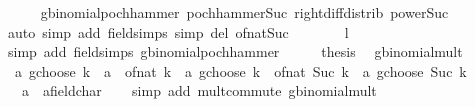 \begin{isabellebody}
\ \ \ \ \isamarkupfalse%
\ gbinomial{\isacharunderscore}{\kern0pt}pochhammer\ pochhammer{\isacharunderscore}{\kern0pt}Suc\ right{\isacharunderscore}{\kern0pt}diff{\isacharunderscore}{\kern0pt}distrib\ power{\isacharunderscore}{\kern0pt}Suc\isanewline
\ \ \ \ \isamarkupfalse%
\ {\isacharparenleft}{\kern0pt}auto\ simp\ add{\isacharcolon}{\kern0pt}\ field{\isacharunderscore}{\kern0pt}simps\ simp\ del{\isacharcolon}{\kern0pt}\ of{\isacharunderscore}{\kern0pt}nat{\isacharunderscore}{\kern0pt}Suc{\isacharparenright}{\kern0pt}\isanewline
\ \ \isamarkupfalse%
\ \isamarkupfalse%
\ {\isachardoublequoteopen}{\isasymdots}\ {\isacharequal}{\kern0pt}\ {\isacharquery}{\kern0pt}l{\isachardoublequoteclose}\isanewline
\ \ \ \ \isamarkupfalse%
\ {\isacharparenleft}{\kern0pt}simp\ add{\isacharcolon}{\kern0pt}\ field{\isacharunderscore}{\kern0pt}simps\ gbinomial{\isacharunderscore}{\kern0pt}pochhammer{\isacharparenright}{\kern0pt}\isanewline
\ \ \isamarkupfalse%
\ \isamarkupfalse%
\ {\isacharquery}{\kern0pt}thesis\ \isacommand{{\isachardot}{\kern0pt}{\isachardot}{\kern0pt}}\isamarkupfalse%
\isanewline
{}\isamarkupfalse%
%
\endisatagproof
{\isafoldproof}%
%
\isadelimproof
\isanewline
%
\endisadelimproof
\isanewline
{}\isamarkupfalse%
\ gbinomial{\isacharunderscore}{\kern0pt}mult{\isacharunderscore}{\kern0pt}{}{\isacharprime}{\kern0pt}{\isacharcolon}{\kern0pt}\isanewline
\ \ {\isachardoublequoteopen}{\isacharparenleft}{\kern0pt}a\ gchoose\ k{\isacharparenright}{\kern0pt}\ {\isacharasterisk}{\kern0pt}\ a\ {\isacharequal}{\kern0pt}\ of{\isacharunderscore}{\kern0pt}nat\ k\ {\isacharasterisk}{\kern0pt}\ {\isacharparenleft}{\kern0pt}a\ gchoose\ k{\isacharparenright}{\kern0pt}\ {\isacharplus}{\kern0pt}\ of{\isacharunderscore}{\kern0pt}nat\ {\isacharparenleft}{\kern0pt}Suc\ k{\isacharparenright}{\kern0pt}\ {\isacharasterisk}{\kern0pt}\ {\isacharparenleft}{\kern0pt}a\ gchoose\ {\isacharparenleft}{\kern0pt}Suc\ k{\isacharparenright}{\kern0pt}{\isacharparenright}{\kern0pt}{\isachardoublequoteclose}\isanewline
\ \ \ a\ {\isacharcolon}{\kern0pt}{\isacharcolon}{\kern0pt}\ {\isachardoublequoteopen}{\isacharprime}{\kern0pt}a{\isacharcolon}{\kern0pt}{\isacharcolon}{\kern0pt}field{\isacharunderscore}{\kern0pt}char{\isacharunderscore}{\kern0pt}{}{\isachardoublequoteclose}\isanewline
%
\isadelimproof
\ \ %
\endisadelimproof
%
\isatagproof
{}\isamarkupfalse%
\ {\isacharparenleft}{\kern0pt}simp\ add{\isacharcolon}{\kern0pt}\ mult{\isachardot}{\kern0pt}commute\ gbinomial{\isacharunderscore}{\kern0pt}mult{\isacharunderscore}{\kern0pt}{}{\isacharparenright}{\kern0pt}%

\end{isabellebody}
